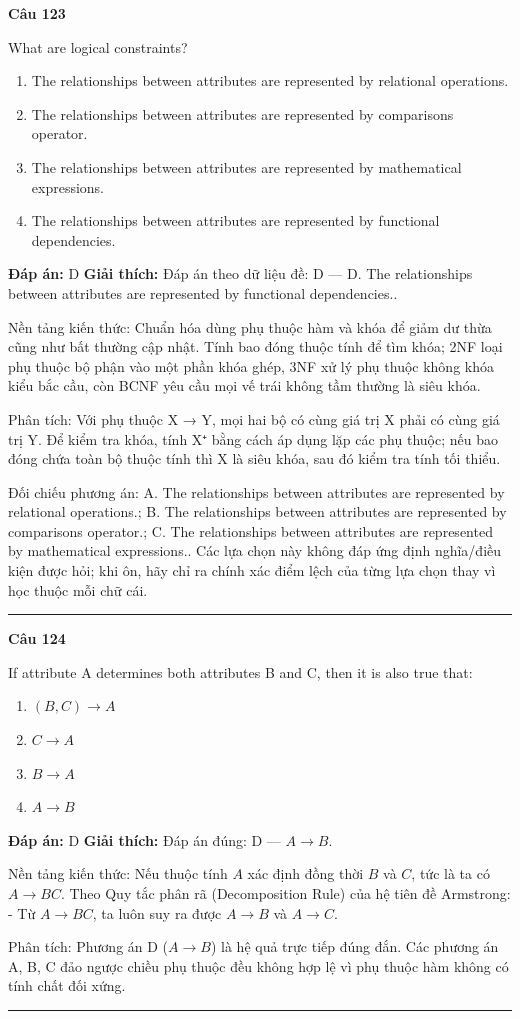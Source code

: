\documentclass[11pt,a4paper]{article}
\newenvironment{question}[1]{%
  \par\vspace{1em}\noindent\textbf{\large Câu #1}\par\vspace{0.4em}
}{%
  \par\vspace{1em}\hrule\vspace{0.6em}
}
\newenvironment{choices}{%
  \begin{enumerate}[label=\textbf{\Alph*.},leftmargin=2.2em,itemsep=2pt,topsep=3pt]
}{%
  \end{enumerate}
}
\newcommand{\choice}{\item}
\begin{document}
\begin{question}{123}
What are logical constraints?
\begin{choices}
\choice The relationships between attributes are represented by relational operations.
\choice The relationships between attributes are represented by comparisons operator.
\choice The relationships between attributes are represented by mathematical expressions.
\choice The relationships between attributes are represented by functional dependencies.
\end{choices}
\textbf{Đáp án:} D
\textbf{Giải thích:} Đáp án theo dữ liệu đề: D — D. The relationships between attributes are represented by functional dependencies..

Nền tảng kiến thức: Chuẩn hóa dùng phụ thuộc hàm và khóa để giảm dư thừa cũng như bất thường cập nhật. Tính bao đóng thuộc tính để tìm khóa; 2NF loại phụ thuộc bộ phận vào một phần khóa ghép, 3NF xử lý phụ thuộc không khóa kiểu bắc cầu, còn BCNF yêu cầu mọi vế trái không tầm thường là siêu khóa.

Phân tích: Với phụ thuộc X → Y, mọi hai bộ có cùng giá trị X phải có cùng giá trị Y. Để kiểm tra khóa, tính X⁺ bằng cách áp dụng lặp các phụ thuộc; nếu bao đóng chứa toàn bộ thuộc tính thì X là siêu khóa, sau đó kiểm tra tính tối thiểu.

Đối chiếu phương án: A. The relationships between attributes are represented by relational operations.; B. The relationships between attributes are represented by comparisons operator.; C. The relationships between attributes are represented by mathematical expressions.. Các lựa chọn này không đáp ứng định nghĩa/điều kiện được hỏi; khi ôn, hãy chỉ ra chính xác điểm lệch của từng lựa chọn thay vì học thuộc mỗi chữ cái.
\end{question}

\begin{question}{124}
If attribute A determines both attributes B and C, then it is also true that:
\begin{choices}
\choice $(B, C) \to A$
\choice $C \to A$
\choice $B \to A$
\choice $A \to B$
\end{choices}
\textbf{Đáp án:} D
\textbf{Giải thích:} Đáp án đúng: D — $A \to B$.

Nền tảng kiến thức: Nếu thuộc tính $A$ xác định đồng thời $B$ và $C$, tức là ta có $A \to BC$. Theo Quy tắc phân rã (Decomposition Rule) của hệ tiên đề Armstrong:
- Từ $A \to BC$, ta luôn suy ra được $A \to B$ và $A \to C$.

Phân tích: Phương án D ($A \to B$) là hệ quả trực tiếp đúng đắn. Các phương án A, B, C đảo ngược chiều phụ thuộc đều không hợp lệ vì phụ thuộc hàm không có tính chất đối xứng.
\end{question}
\end{document}
